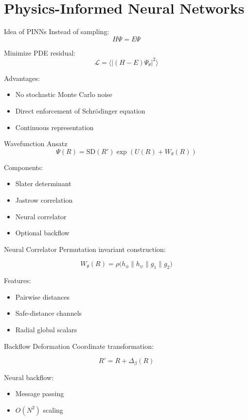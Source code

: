 \documentclass{beamer}
\begin{document}
\section{Physics-Informed Neural Networks}

\begin{frame}{Idea of PINNs}
Instead of sampling:
\[
H\Psi = E\Psi
\]

Minimize PDE residual:
\[
\mathcal{L}
=
\langle |(H-E)\Psi_\theta|^2 \rangle
\]

Advantages:
\begin{itemize}
\item No stochastic Monte Carlo noise
\item Direct enforcement of Schrödinger equation
\item Continuous representation
\end{itemize}
\end{frame}

\begin{frame}{Wavefunction Ansatz}
\[
\Psi(R)
=
\text{SD}(R')
\exp(U(R) + W_\theta(R))
\]

Components:
\begin{itemize}
\item Slater determinant
\item Jastrow correlation
\item Neural correlator
\item Optional backflow
\end{itemize}
\end{frame}

\begin{frame}{Neural Correlator}
Permutation invariant construction:

\[
W_\theta(R)
=
\rho\Big(h_\phi \parallel h_\psi \parallel g_1 \parallel g_2\Big)
\]

Features:
\begin{itemize}
\item Pairwise distances
\item Safe-distance channels
\item Radial global scalars
\end{itemize}
\end{frame}

\begin{frame}{Backflow Deformation}
Coordinate transformation:

\[
R' = R + \Delta_\beta(R)
\]

Neural backflow:
\begin{itemize}
\item Message passing
\item $O(N^2)$ scaling
\end{itemize}
\end{frame}
\end{document}
